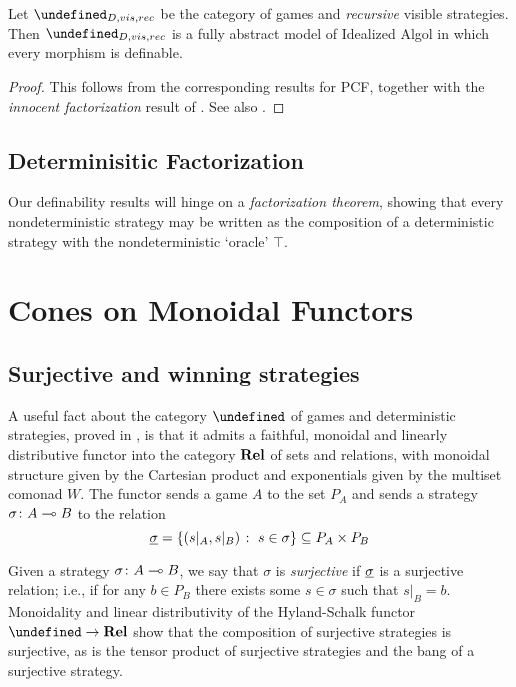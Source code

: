 \documentclass[sigplan,10pt,review]{acmart}\settopmatter{printfolios=true,printccs=false,printacmref=false}
\let\G\undefined
\begin{document}
\begin{proposition}
  Let $\G_{D,vis,rec}$ be the category of games and \emph{recursive} visible strategies.  
  Then $\G_{D,vis,rec}$ is a fully abstract model of Idealized Algol in which every morphism is definable.
\end{proposition}
\begin{proof}
  This follows from the corresponding results for PCF, together with the \emph{innocent factorization} result of \cite{SamsonGuyIAPassive}.  
  See also \cite{MurawskiUniversality}.
\end{proof}

\subsection{Determinisitic Factorization}

Our definability results will hinge on a \emph{factorization theorem}, showing that every nondeterministic strategy may be written as the composition of a deterministic strategy with the nondeterministic `oracle' $\top$.  


\section{Cones on Monoidal Functors}

\subsection{Surjective and winning strategies}

A useful fact about the category $\G$ of games and deterministic strategies, proved in \cite{hylandSchalkGames}, is that it admits a faithful, monoidal and linearly distributive functor into the category ${\normalfont\textbf{Rel}}$ of sets and relations, with monoidal structure given by the Cartesian product and exponentials given by the multiset comonad $W$.  
The functor sends a game $A$ to the set $P_A$ and sends a strategy $\sigma\colon A\multimap B$ to the relation
\[
  \underline{\sigma}=\{(s\vert_A,s\vert_B)\;\colon\; s\in\sigma\}\subseteq P_A\times P_B
  \]

Given a strategy $\sigma\colon A\multimap B$, we say that $\sigma$ is \emph{surjective} if $\underline{\sigma}$ is a surjective relation; i.e., if for any $b\in P_B$ there exists some $s\in\sigma$ such that $s\vert_B=b$.  
Monoidality and linear distributivity of the Hyland-Schalk functor $\G\to\Rel$ show that the composition of surjective strategies is surjective, as is the tensor product of surjective strategies and the bang of a surjective strategy.  
\end{document}
